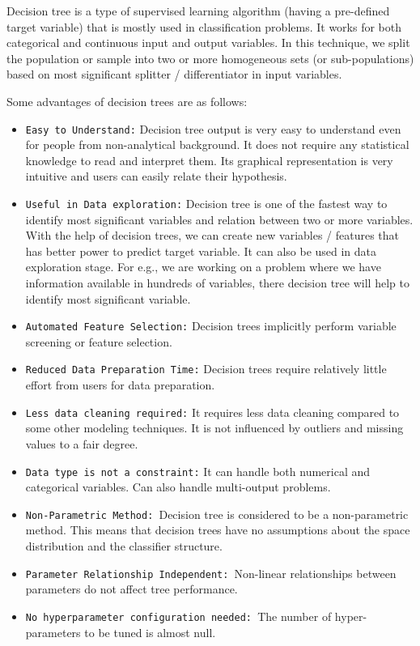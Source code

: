 \documentclass[12pt]{article}
\begin{document}
Decision tree is a type of supervised learning algorithm (having a pre-defined target variable) that is mostly used in classification problems. It works for both categorical and continuous input and output variables. In this technique, we split the population or sample into two or more homogeneous sets (or sub-populations) based on most significant splitter / differentiator in input variables.

Some advantages of decision trees are as follows:

\begin{itemize}
\item 
\texttt{Easy to Understand:} Decision tree output is very easy to understand even for people from non-analytical background. It does not require any statistical knowledge to read and interpret them. Its graphical representation is very intuitive and users can easily relate their hypothesis.

\item
\texttt{Useful in Data exploration:} Decision tree is one of the fastest way to identify most significant variables and relation between two or more variables. With the help of decision trees, we can create new variables / features that has better power to predict target variable. It can also be used in data exploration stage. For e.g., we are working on a problem where we have information available in hundreds of variables, there decision tree will help to identify most significant variable.

\item
\texttt{Automated Feature Selection:} Decision trees implicitly perform variable screening or feature selection.

\item
\texttt{Reduced Data Preparation Time:} Decision trees require relatively little effort from users for data preparation.

\item
\texttt{Less data cleaning required:} It requires less data cleaning compared to some other modeling techniques. It is not influenced by outliers and missing values to a fair degree.

\item
\texttt{Data type is not a constraint:} It can handle both numerical and categorical variables. Can also handle multi-output problems.

\item
\texttt{Non-Parametric Method: }Decision tree is considered to be a non-parametric method. This means that decision trees have no assumptions about the space distribution and the classifier structure.

\item
\texttt{Parameter Relationship Independent: }Non-linear relationships between parameters do not affect tree performance.

\item
\texttt{No hyperparameter configuration needed: }The number of hyper-parameters to be tuned is almost null.

\end{itemize}
\end{document}
